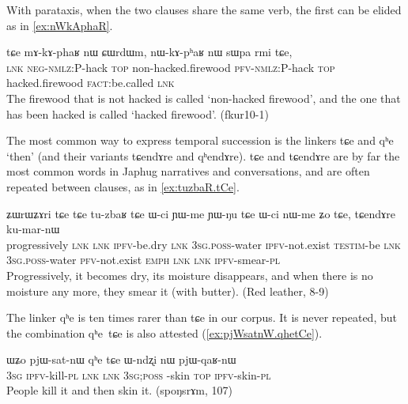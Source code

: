 \documentclass[oldfontcommands,oneside,a4paper,11pt]{article}
\newcommand{\ipa}[1]{{\phon \mbox{#1}}} %
\begin{document}
With parataxis, when the two clauses share the same verb, the first can be elided as in \ref{ex:nWkAphaR}.

\begin{exe}
\ex \label{ex:nWkAphaR}
\gll 
\ipa{tɕe}  	\ipa{mɤ-kɤ-phaʁ}  	\ipa{nɯ}  	\ipa{ɕɯrdɯm,}  	\ipa{nɯ-kɤ-pʰaʁ}  	\ipa{nɯ}  	\ipa{sɯpa}  	\ipa{rmi}  	\ipa{tɕe,}  	\\
\textsc{lnk} \textsc{neg-nmlz:}P-hack \textsc{top} non-hacked.firewood \textsc{pfv-nmlz:}P-hack \textsc{top} hacked.firewood \textsc{fact}:be.called \textsc{lnk} \\
\glt The firewood that is not hacked is called `non-hacked firewood', and the one that has been hacked is called `hacked firewood'. (fkur10-1)
\end{exe}

The most common way to express temporal succession is the linkers \ipa{tɕe} and \ipa{qʰe} `then' (and their variants \ipa{tɕendɤre} and \ipa{qʰendɤre}). \ipa{tɕe}   and \ipa{tɕendɤre} are by far the most common words in Japhug narratives and conversations, and are often repeated between clauses, as in \ref{ex:tuzbaR.tCe}. 

\begin{exe}
\ex \label{ex:tuzbaR.tCe}
\gll 
\ipa{ʑɯrɯʑɤri}  	\ipa{tɕe}  	\ipa{tɕe}  	\ipa{tu-zbaʁ}  	\ipa{tɕe}  	\ipa{ɯ-ci}  	\ipa{ɲɯ-me}  	\ipa{ɲɯ-ŋu}  	\ipa{tɕe}  	\ipa{ɯ-ci}  	\ipa{nɯ-me}  	\ipa{ʑo}  	\ipa{tɕe,}  	\ipa{tɕendɤre}  	\ipa{ku-mar-nɯ}  \\
progressively \textsc{lnk}  \textsc{lnk} \textsc{ipfv}-be.dry   \textsc{lnk}  \textsc{3sg.poss}-water \textsc{ipfv}-not.exist \textsc{testim}-be \textsc{lnk} \textsc{3sg.poss}-water \textsc{pfv}-not.exist \textsc{emph} \textsc{lnk}  \textsc{lnk} \textsc{ipfv}-smear-\textsc{pl} \\
\glt Progressively, it becomes dry, its moisture  disappears, and when there is no moisture any more, they smear it (with butter). (Red leather, 8-9)
\end{exe}

The linker \ipa{qʰe} is ten times rarer than \ipa{tɕe} in our corpus. It is  never repeated, but the combination \ipa{qʰe tɕe} is also attested (\ref{ex:pjWsatnW.qhetCe}).

\begin{exe}
\ex \label{ex:pjWsatnW.qhetCe}
\gll 
\ipa{ɯʑo}  	\ipa{pjɯ-sat-nɯ}  	\ipa{qʰe}  	\ipa{tɕe}  	\ipa{ɯ-ndʐi}  	\ipa{nɯ}  	\ipa{pjɯ-qaʁ-nɯ}  \\
\textsc{3sg} \textsc{ipfv}-kill-\textsc{pl} \textsc{lnk}  \textsc{lnk} \textsc{3sg;poss }-skin \textsc{top} \textsc{ipfv}-skin-\textsc{pl} \\
\glt People kill it and then skin it. (spoŋsrɤm, 107)
\end{exe}
\end{document}
